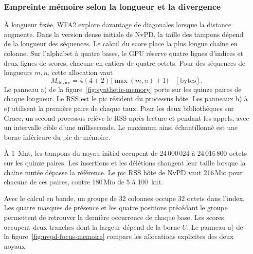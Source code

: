 \subsubsection{Empreinte mémoire selon la longueur et la divergence}
À longueur fixée, WFA2 explore davantage de diagonales lorsque la distance augmente. Dans la version dense initiale de NvPD, la taille des tampons dépend de la longueur des séquences. Le calcul du score place la plus longue chaîne en colonne. Sur l'alphabet à quatre bases, le GPU réserve quatre lignes d'indices et deux lignes de scores, chacune en entiers de quatre octets. Pour des séquences de longueurs \(m,n\), cette allocation vaut
\[
  M_{\mathrm{device}}=4(4+2)\bigl(\max(m,n)+1\bigr)\quad [\mathrm{bytes}].
\]
Le panneau a) de la figure~\ref{fig:synthetic-memory} porte sur les quinze paires de chaque longueur. Le RSS est le pic résident du processus hôte. Les panneaux b) à e) utilisent la première paire de chaque taux. Pour les deux bibliothèques sur Grace, un second processus relève le RSS après lecture et pendant les appels, avec un intervalle cible d'une milliseconde. Le maximum ainsi échantillonné est une borne inférieure du pic de mémoire.

À 1~Mnt, les tampons du noyau initial occupent de 24\,000\,024 à 24\,016\,800 octets sur les quinze paires. Les insertions et les délétions changent leur taille lorsque la chaîne mutée dépasse la référence. Le pic RSS hôte de NvPD vaut 216\,Mio pour chacune de ces paires, contre 180\,Mio de 5 à 100~knt.

Avec le calcul en bande, un groupe de 32 colonnes occupe 32 octets dans l’index. Les quatre masques de présence et les quatre positions précédant le groupe permettent de retrouver la dernière occurrence de chaque base. Les scores occupent deux tranches dont la largeur dépend de la borne \(U\). Le panneau a) de la figure~\ref{fig:nvpd-focus-memoire} compare les allocations explicites des deux noyaux.

